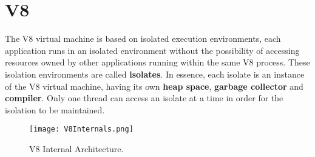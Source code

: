\documentclass{l4proj}
\begin{document}
\section{V8}
\hspace*{3em} The V8 virtual machine is based on isolated execution environments, each application runs in an isolated environment without the possibility of accessing resources owned by other applications running within the same V8 process. These isolation environments are called \textbf{isolates}. In essence, each isolate is an instance of the V8 virtual machine, having its own \textbf{heap space}, \textbf{garbage collector} and \textbf{compiler}. Only one thread can access an isolate at a time in order for the isolation to be maintained. 

\begin{figure}[!ht]
  \centering
    \texttt{[image: V8Internals.png]}
  \caption{V8 Internal Architecture.}
\end{figure}
\end{document}
